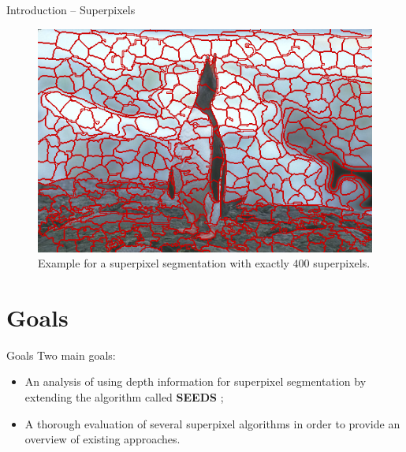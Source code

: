 \documentclass[handout]{beamer}
\begin{document}
	\begin{frame}{Introduction -- Superpixels}
		\begin{figure}
   			\centering
   			\includegraphics[scale=0.5]{images/bsd-2-reseedssm-400}
   			\caption{Example for a superpixel segmentation with exactly $400$ superpixels.}
   		\end{figure}
	\end{frame}
	
	\section{Goals}
	\begin{frame}{Goals}
		Two main goals:
		\vskip 0.25cm
		\begin{itemize}[label=1.]
			\item An analysis of using depth information for superpixel segmentation by extending the algorithm called \textbf{SEEDS} \cite{VanDenBerghBoixRoigCapitaniVanGool:2012};
		\end{itemize}
		\pause
		
		\begin{itemize}[label=2.]
			\item A thorough evaluation of several superpixel algorithms in order to provide an overview of existing approaches.
		\end{itemize}
	\end{frame}
	
\end{document}
